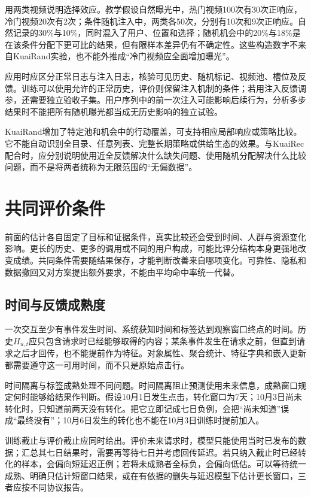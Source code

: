 用两类视频说明选择效应。教学假设自然曝光中，热门视频100次有30次正响应，冷门视频20次有2次；条件随机注入中，两类各50次，分别有10次和9次正响应。自然记录的30\%与10\%，同时混入了用户、位置和选择；随机机会中的20\%与18\%是在该条件分配下更可比的结果，但有限样本差异仍有不确定性。这些构造数字不来自KuaiRand实验，也不能外推成“冷门视频应全面增加曝光”。

应用时应区分正常日志与注入日志，核验可见历史、随机标记、视频池、槽位及反馈。训练可以使用允许的正常历史，评价则保留注入机制的条件；若用注入反馈调参，还需要独立验收子集。用户序列中的前一次注入可能影响后续行为，分析多步结果时不能把所有随机曝光都当成无历史影响的独立试验。

KuaiRand增加了特定池和机会中的行动覆盖，可支持相应局部响应或策略比较。它不能自动识别全目录、任意列表、完整长期策略或供给生态的效果。与KuaiRec配合时，应分别说明使用近全反馈解决什么缺失问题、使用随机分配解决什么比较问题，而不是将两者统称为无限范围的“无偏数据”。

\section{共同评价条件}
\label{sec:rs-evaluation-conditions}

前面的估计各自固定了目标和证据条件，真实比较还会受到时间、人群与资源变化影响。更长的历史、更多的调用或不同的用户构成，可能比评分结构本身更强地改变成绩。共同条件需要随结果保存，才能判断改善来自哪项变化。可靠性、隐私和数据撤回又对方案提出额外要求，不能由平均命中率统一代替。

\subsection{时间与反馈成熟度}
\label{sec:rs-evaluation-time}

一次交互至少有事件发生时间、系统获知时间和标签达到观察窗口终点的时间。历史$H_{u,t}$应只包含请求时已经能够取得的内容；某条事件发生在请求之前，但直到请求之后才回传，也不能提前作为特征。对象属性、聚合统计、特征字典和嵌入更新都需要遵守这一可用时间，而不只是原始点击行。

时间隔离与标签成熟处理不同问题。时间隔离阻止预测使用未来信息，成熟窗口规定何时能够给结果作判断。假设10月1日发生点击，转化窗口为7天；10月3日尚未转化时，只知道前两天没有转化。把它立即记成七日负例，会把“尚未知道”误成“最终没有”；10月6日发生的转化也不能在10月3日训练时提前加入。

训练截止与评价截止应同时给出。评价未来请求时，模型只能使用当时已发布的数据；汇总其七日结果时，需要再等待七日并考虑回传延迟。若只纳入截止时已经转化的样本，会偏向短延迟正例；若将未成熟者全标负，会偏向低估。可以等待统一成熟、明确只估计短窗口结果，或在有依据的删失与延迟模型下估计更长窗口，三者应按不同协议报告。

